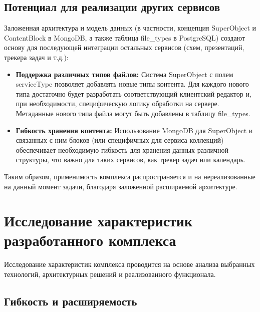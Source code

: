 \subsection{Потенциал для реализации других сервисов}

Заложенная архитектура и модель данных (в частности, концепция SuperObject и ContentBlock в MongoDB, а также таблица file\_types в PostgreSQL) создают основу для последующей интеграции остальных сервисов (схем, презентаций, трекера задач и т.д.):
\begin{itemize}
    \item \textbf{Поддержка различных типов файлов:} Система SuperObject с полем serviceType позволяет добавлять новые типы контента. Для каждого нового типа достаточно будет разработать соответствующий клиентский редактор и, при необходимости, специфическую логику обработки на сервере. Метаданные нового типа файла могут быть добавлены в таблицу file\_types.
    \item \textbf{Гибкость хранения контента:} Использование MongoDB для SuperObject и связанных с ним блоков (или специфичных для сервиса коллекций) обеспечивает необходимую гибкость для хранения данных различной структуры, что важно для таких сервисов, как трекер задач или календарь.
\end{itemize}
Таким образом, применимость комплекса распространяется и на нереализованные на данный момент задачи, благодаря заложенной расширяемой архитектуре.

\clearpage
\section{Исследование характеристик разработанного комплекса}

Исследование характеристик комплекса проводится на основе анализа выбранных технологий, архитектурных решений и реализованного функционала.

\subsection{Гибкость и расширяемость}

